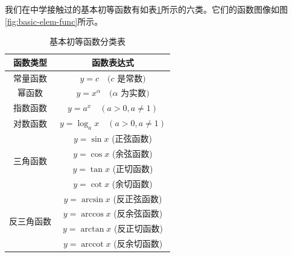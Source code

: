 \documentclass[lang=cn,newtx,10pt,scheme=chinese]{elegantbook}
\begin{document}
我们在中学接触过的基本初等函数有如表\ref{tab:基本初等函数分类表}所示的六类。它们的函数图像如图\ref{fig:basic-elem-func}所示。

\begin{table}[h]
\caption{基本初等函数分类表}
\centering
\renewcommand{\arraystretch}{1.5} %
\begin{tabular}{c|c}
\hline
\rowcolor{gray!50}
\textbf{函数类型} & \textbf{函数表达式} \\
\hline
常量函数 & $y=c \quad (c$ 是常数$)$ \\
\hline
幂函数 & $y=x^\alpha \quad (\alpha$ 为实数$)$ \\
\hline
指数函数 & $y=a^x \quad (a>0, a \neq 1)$ \\
\hline
对数函数 & $y=\log_a x \quad (a>0, a \neq 1)$ \\
\hline
\multirow{4}{*}{三角函数} & $y=\sin x$ (正弦函数) \\
 & $y=\cos x$ (余弦函数) \\
 & $y=\tan x$ (正切函数) \\
 & $y=\cot x$ (余切函数) \\
\hline
\multirow{4}{*}{反三角函数} & $y=\arcsin x$ (反正弦函数) \\
 & $y=\arccos x$ (反余弦函数) \\
 & $y=\arctan x$ (反正切函数) \\
 & $y=\operatorname{arccot} x$ (反余切函数) \\
\hline
\end{tabular}
\label{tab:基本初等函数分类表}
\end{table}
\end{document}
